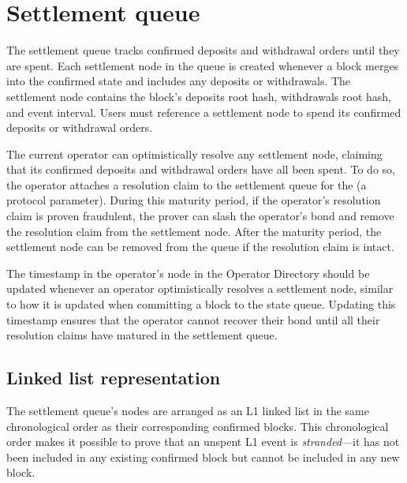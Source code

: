 \documentclass[../midgard.tex]{subfiles}
\begin{document}
\section{Settlement queue}
\label{h:settlement-queue}

The settlement queue tracks confirmed deposits and withdrawal orders until they are spent.
Each settlement node in the queue is created whenever a block merges into the confirmed state and includes any deposits or withdrawals.
The settlement node contains the block's deposits root hash, withdrawals root hash, and event interval.
Users must reference a settlement node to spend its confirmed deposits or withdrawal orders.

The current operator can optimistically resolve any settlement node, claiming that its confirmed deposits and withdrawal orders have all been spent.
To do so, the operator attaches a resolution claim to the settlement queue for the  (a protocol parameter).
During this maturity period, if the operator's resolution claim is proven fraudulent, the prover can slash the operator's bond and remove the resolution claim from the settlement node.
After the maturity period, the settlement node can be removed from the queue if the resolution claim is intact.


The timestamp in the operator's node in the Operator Directory should be updated whenever an operator optimistically resolves a settlement node, similar to how it is updated when committing a block to the state queue.
Updating this timestamp ensures that the operator cannot recover their bond until all their resolution claims have matured in the settlement queue.

\subsection{Linked list representation}%
\label{h:settlement-queue-linked-list}%

The settlement queue's nodes are arranged as an L1 linked list in the same chronological order as their corresponding confirmed blocks.
This chronological order makes it possible to prove that an unspent L1 event is \emph{stranded}---it has not been included in any existing confirmed block but cannot be included in any new block.
\end{document}
